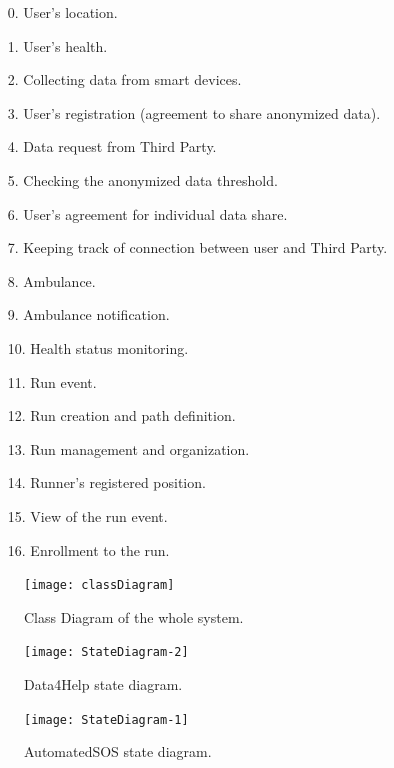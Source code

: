 \documentclass[a4paper]{article}
\begin{document}
\begin{enumerate} \itemsep=2pt
    \item [0.] User's location.
    \item [1.] User's health.
    \item [2.] Collecting data from smart devices.
    \item [3.] User's registration (agreement to share anonymized data).
    \item [4.] Data request from Third Party.
    \item [5.] Checking the anonymized data threshold.
    \item [6.] User's agreement for individual data share.
    \item [7.] Keeping track of connection between user and Third Party.
    \item [8.] Ambulance.
    \item [9.] Ambulance notification.
    \item [10.] Health status monitoring.
    \item [11.] Run event.
    \item [12.] Run creation and path definition.
    \item [13.] Run management and organization.
    \item [14.] Runner's registered position.
    \item [15.] View of the run event.
    \item [16.] Enrollment to the run.
\end{enumerate}

\clearpage

\begin{figure}
    \centering
    \texttt{[image: classDiagram]}
    \caption{Class Diagram of the whole system.}
    \label{fig:my_label}
\end{figure}

\clearpage

\begin{figure}[H]
    \centering
    \texttt{[image: StateDiagram-2]}
    \caption{Data4Help state diagram.}
    \label{fig:my_label}
\end{figure}

\vspace{0.5cm}

\begin{figure}[H]
    \centering
    \texttt{[image: StateDiagram-1]}
    \caption{AutomatedSOS state diagram.}
    \label{fig:my_label}
\end{figure}
\end{document}
